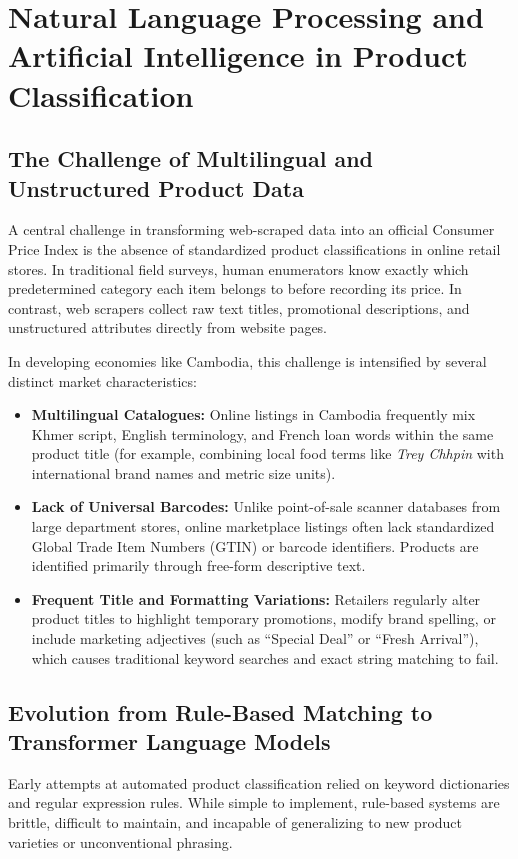 \section{Natural Language Processing and Artificial Intelligence in Product Classification}
\subsection{The Challenge of Multilingual and Unstructured Product Data}
\hs A central challenge in transforming web-scraped data into an official Consumer Price Index is the absence of standardized product classifications in online retail stores. In traditional field surveys, human enumerators know exactly which predetermined category each item belongs to before recording its price. In contrast, web scrapers collect raw text titles, promotional descriptions, and unstructured attributes directly from website pages.

\hs In developing economies like Cambodia, this challenge is intensified by several distinct market characteristics:
\begin{itemize}
    \item \textbf{Multilingual Catalogues:} Online listings in Cambodia frequently mix Khmer script, English terminology, and French loan words within the same product title (for example, combining local food terms like \textit{Trey Chhpin} with international brand names and metric size units).
    \item \textbf{Lack of Universal Barcodes:} Unlike point-of-sale scanner databases from large department stores, online marketplace listings often lack standardized Global Trade Item Numbers (GTIN) or barcode identifiers. Products are identified primarily through free-form descriptive text.
    \item \textbf{Frequent Title and Formatting Variations:} Retailers regularly alter product titles to highlight temporary promotions, modify brand spelling, or include marketing adjectives (such as ``Special Deal'' or ``Fresh Arrival''), which causes traditional keyword searches and exact string matching to fail.
\end{itemize}

\subsection{Evolution from Rule-Based Matching to Transformer Language Models}
\hs Early attempts at automated product classification relied on keyword dictionaries and regular expression rules. While simple to implement, rule-based systems are brittle, difficult to maintain, and incapable of generalizing to new product varieties or unconventional phrasing.

